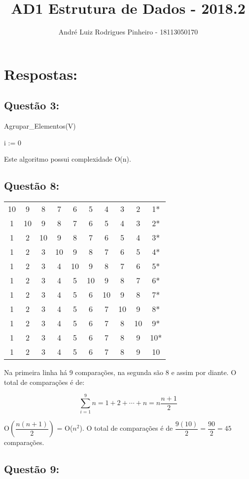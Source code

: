 \documentclass[a4paper,11pt]{article}
\title{AD1 Estrutura de Dados - 2018.2}
\author{André Luiz Rodrigues Pinheiro - 18113050170}
\begin{document}
\maketitle

\section*{Respostas:}

\subsection*{Questão 3:}

\begin{algorithm}
\caption{Agrupar\_Elementos(V)}
i := 0\\
\endpara
\end{algorithm}

Este algoritmo possui complexidade O(n).

\subsection*{Questão 8:}

\begin{center}
\begin{tabular}{cccccccccc}
  10 & 9 & 8 & 7 & 6 & 5 & 4 & 3& 2 & 1* \\
  1 & 10 & 9 & 8 & 7 & 6 & 5 & 4 & 3& 2*  \\
  1 & 2 & 10 & 9 & 8 & 7 & 6 & 5 & 4 & 3*  \\
  1 & 2 & 3 & 10 & 9 & 8 & 7 & 6 & 5 & 4* \\
  1 & 2 & 3 & 4 & 10 & 9 & 8 & 7 & 6 & 5* \\
  1 & 2 & 3 & 4 & 5 & 10 & 9 & 8 & 7 & 6* \\
  1 & 2 & 3 & 4 & 5 & 6 & 10 & 9 & 8 & 7* \\
  1 & 2 & 3 & 4 & 5 & 6 & 7 & 10 & 9 & 8* \\
  1 & 2 & 3 & 4 & 5 & 6 & 7 & 8 & 10 & 9* \\
  1 & 2 & 3 & 4 & 5 & 6 & 7 & 8 & 9 & 10* \\
  1 & 2 & 3 & 4 & 5 & 6 & 7 & 8 & 9 & 10
\end{tabular}
\end{center}
Na primeira linha há 9 comparações, na segunda são 8 e assim por diante. O total de comparações é de:

\[ \sum_{i=1}^9 n = 1 + 2 + \cdots + n = n\frac{n+1}{2}\]

O$\left(\dfrac{n(n+1)}{2}\right)$ = O($n^2$). O total de comparações é de $\dfrac{9(10)}{2} = \dfrac{90}{2} = 45$ comparações.

\subsection*{Questão 9:}
\end{document}
